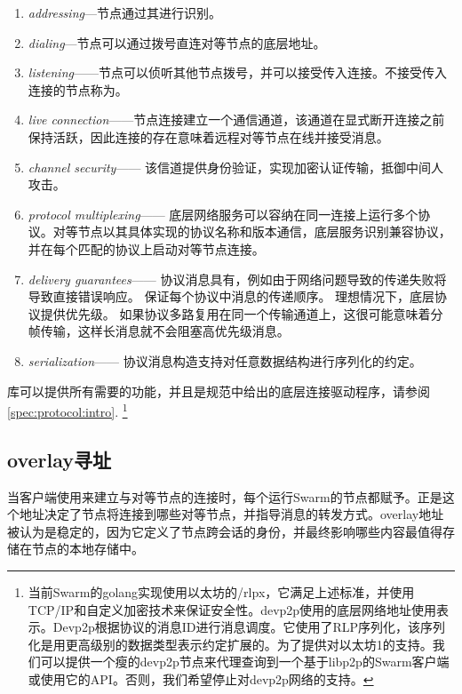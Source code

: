 \begin{enumerate}
    \item \emph{addressing}—节点通过其进行识别。
    \item \emph{dialing}—节点可以通过拨号直连对等节点的底层地址。
    \item \emph{listening}——节点可以侦听其他节点拨号，并可以接受传入连接。不接受传入连接的节点称为。
    \item \emph{live connection}——节点连接建立一个通信通道，该通道在显式断开连接之前保持活跃，因此连接的存在意味着远程对等节点在线并接受消息。
    \item \emph{channel security}——
该信道提供身份验证，实现加密认证传输，抵御中间人攻击。
    \item \emph{protocol multiplexing}——
底层网络服务可以容纳在同一连接上运行多个协议。对等节点以其具体实现的协议名称和版本通信，底层服务识别兼容协议，并在每个匹配的协议上启动对等节点连接。 
    \item \emph{delivery guarantees}——
协议消息具有，例如由于网络问题导致的传递失败将导致直接错误响应。
保证每个协议中消息的传递顺序。
理想情况下，底层协议提供优先级。
如果协议多路复用在同一个传输通道上，这很可能意味着分帧传输，这样长消息就不会阻塞高优先级消息。
    \item \emph{serialization}——
协议消息构造支持对任意数据结构进行序列化的约定。
    
\end{enumerate}

库可以提供所有需要的功能，并且是规范中给出的底层连接驱动程序，请参阅\ref{spec:protocol:intro}.%
%
\footnote{当前Swarm的golang实现使用以太坊的/rlpx，它满足上述标准，并使用TCP/IP和自定义加密技术来保证安全性。devp2p使用的底层网络地址使用表示。Devp2p根据协议的消息ID进行消息调度。它使用了RLP序列化，该序列化是用更高级别的数据类型表示约定扩展的。为了提供对以太坊1的支持。我们可以提供一个瘦的devp2p节点来代理查询到一个基于libp2p的Swarm客户端或使用它的API。否则，我们希望停止对devp2p网络的支持。}

\subsection{overlay寻址\statusgreen}\label{sec:overlay-addressing} 
\green{}

当客户端使用来建立与对等节点的连接时，每个运行Swarm的节点都赋予。正是这个地址决定了节点将连接到哪些对等节点，并指导消息的转发方式。overlay地址被认为是稳定的，因为它定义了节点跨会话的身份，并最终影响哪些内容最值得存储在节点的本地存储中。

